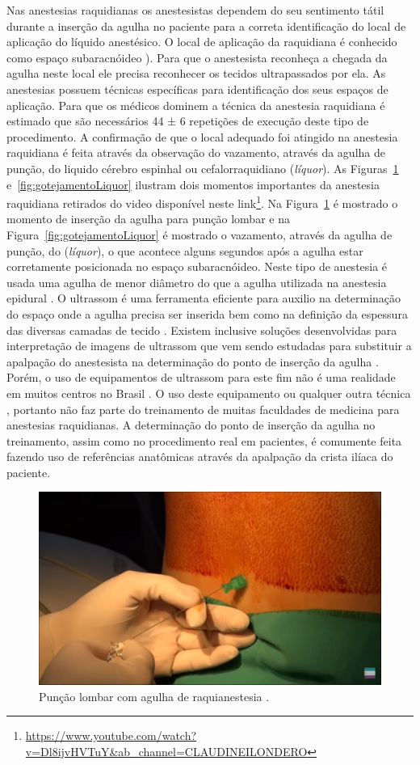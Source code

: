 Nas anestesias raquidianas os anestesistas dependem do seu sentimento tátil durante a inserção da agulha no paciente para a correta identificação do local de aplicação do líquido anestésico. O local de aplicação da raquidiana é conhecido como espaço subaracnóideo \cite{Miller2009}). Para que o anestesista reconheça a chegada da agulha neste local ele precisa reconhecer os tecidos ultrapassados por ela. As anestesias possuem técnicas específicas para identificação dos seus espaços de aplicação. Para que os médicos dominem a técnica da anestesia raquidiana é estimado que são necessários 44 ± 6 repetições de execução deste tipo de procedimento. A confirmação de que o local adequado foi atingido na anestesia raquidiana é feita através da observação do vazamento, através da agulha de punção, do liquido cérebro espinhal ou cefalorraquidiano (\textit{líquor}). As Figuras~\ref{fig:puncaoLombar} e~\ref{fig:gotejamentoLiquor} ilustram dois momentos importantes da anestesia raquidiana retirados do video disponível neste link\footnote{\url{https://www.youtube.com/watch?v=Dl8ijvHVTuY&ab\_channel=CLAUDINEILONDERO}}. Na Figura~\ref{fig:puncaoLombar} é mostrado o momento de inserção da agulha para punção lombar e na Figura~\ref{fig:gotejamentoLiquor} é mostrado o vazamento, através da agulha de punção, do (\textit{líquor}), o que acontece alguns segundos após a agulha estar corretamente posicionada no espaço subaracnóideo. Neste tipo de anestesia é usada uma agulha de menor diâmetro do que a agulha utilizada na anestesia epidural \cite{Miller2009}. O ultrassom é uma ferramenta eficiente para auxilio na determinação do espaço onde a agulha precisa ser inserida \cite{Helayel2010, Soni2019} bem como na definição da espessura das diversas camadas de tecido \cite{Klingensmith2022}. Existem inclusive soluções desenvolvidas para interpretação de imagens de ultrassom que vem sendo estudadas para substituir a apalpação do anestesista na determinação do ponto de inserção da agulha \cite{Ni2021}. Porém, o uso de equipamentos de ultrassom para este fim não é uma realidade em muitos centros no Brasil \cite{Hamaji2016}. O uso deste equipamento ou qualquer outra técnica \cite{Berde2022}, portanto não faz parte do treinamento de muitas faculdades de medicina para anestesias raquidianas. A determinação do ponto de inserção da agulha no treinamento, assim como no procedimento real em pacientes, é comumente feita fazendo uso de referências anatômicas através da apalpação da crista ilíaca do paciente.

\begin{figure}[!ht]
   \centering
   \includegraphics[width=0.6\linewidth]{capitulos/figuras/2.PuncaoLombar.png}
   \caption{Punção lombar com agulha de raquianestesia  \cite{Londero2018}.}
   \label{fig:puncaoLombar}
\end{figure}


